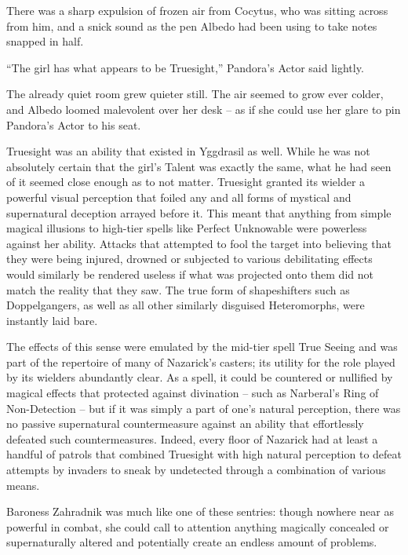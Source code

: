  

There was a sharp expulsion of frozen air from Cocytus, who was sitting across from him, and a snick sound as the pen Albedo had been using to take notes snapped in half.

 

“The girl has what appears to be Truesight,” Pandora’s Actor said lightly.

 

The already quiet room grew quieter still. The air seemed to grow ever colder, and Albedo loomed malevolent over her desk – as if she could use her glare to pin Pandora’s Actor to his seat.

 

Truesight was an ability that existed in Yggdrasil as well. While he was not absolutely certain that the girl’s Talent was exactly the same, what he had seen of it seemed close enough as to not matter. Truesight granted its wielder a powerful visual perception that foiled any and all forms of mystical and supernatural deception arrayed before it. This meant that anything from simple magical illusions to high-tier spells like Perfect Unknowable were powerless against her ability. Attacks that attempted to fool the target into believing that they were being injured, drowned or subjected to various debilitating effects would similarly be rendered useless if what was projected onto them did not match the reality that they saw. The true form of shapeshifters such as Doppelgangers, as well as all other similarly disguised Heteromorphs, were instantly laid bare.

 

The effects of this sense were emulated by the mid-tier spell True Seeing and was part of the repertoire of many of Nazarick’s casters; its utility for the role played by its wielders abundantly clear. As a spell, it could be countered or nullified by magical effects that protected against divination – such as Narberal’s Ring of Non-Detection – but if it was simply a part of one’s natural perception, there was no passive supernatural countermeasure against an ability that effortlessly defeated such countermeasures. Indeed, every floor of Nazarick had at least a handful of patrols that combined Truesight with high natural perception to defeat attempts by invaders to sneak by undetected through a combination of various means.

 

Baroness Zahradnik was much like one of these sentries: though nowhere near as powerful in combat, she could call to attention anything magically concealed or supernaturally altered and potentially create an endless amount of problems.

